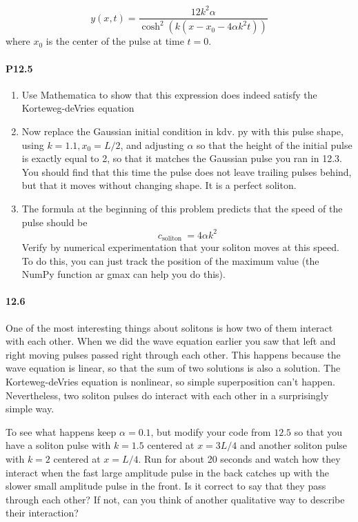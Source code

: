 \documentclass{book}
\theoremstyle{plain}
\theoremstyle{definition}
\numberwithin{exm}{chapter}
\theoremstyle{remark}
\theoremstyle{summary}
\theoremstyle{overview}
\begin{document}
\begin{equation}\label{eq:1214}
y(x, t)=\frac{12 k^{2} \alpha}{\cosh ^{2}\left(k\left(x-x_{0}-4 \alpha k^{2} t\right)\right)}
\end{equation}
where $x_0$ is the center of the pulse at time $t = 0$.
\paragraph*{P12.5}
\begin{enumerate}[label=(\alph*)]
\item Use Mathematica to show that this expression does indeed satisfy the
Korteweg-deVries equation
\item Now replace the Gaussian initial condition in $\mathrm{kdv}$. py with this pulse shape, using $k=1.1, x_{0}=L / 2$, and adjusting $\alpha$ so that the height of the initial pulse is exactly equal to 2, so that it matches the Gaussian pulse you ran in 12.3. You should find that this time the pulse does not leave trailing pulses behind, but that it moves without changing shape. It is a perfect soliton.
\item The formula at the beginning of this problem predicts that the speed of the pulse should be 
\begin{equation}\label{eq:1215}
c_{\text {soliton }}=4 \alpha k^{2}
\end{equation}
Verify by numerical experimentation that your soliton moves at this speed. To do this, you can just track the position of the maximum value (the NumPy function ar gmax can help you do this).
\end{enumerate}
\paragraph*{12.6}
One of the most interesting things about solitons is how two of them interact with each other. When we did the wave equation earlier you saw that left and right moving pulses passed right through each other. This happens because the wave equation is linear, so that the sum of two solutions is also a solution. The Korteweg-deVries equation is nonlinear, so simple superposition can't happen. Nevertheless, two soliton pulses do interact with each other in a surprisingly simple way.

To see what happens keep $\alpha=0.1$, but modify your code from $12.5$ so that you have a soliton pulse with $k=1.5$ centered at $x=3 L / 4$ and another soliton pulse with $k=2$ centered at $x=L / 4$. Run for about 20 seconds and watch how they interact when the fast large amplitude pulse in the back catches up with the slower small amplitude pulse in the front. Is it correct to say that they pass through each other? If not, can you think of another qualitative way to describe their interaction?
\end{document}
